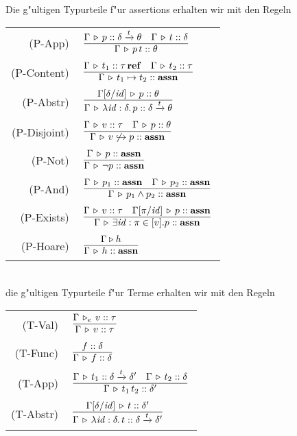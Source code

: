 \documentclass[12pt,a4paper,bigheadings]{scrartcl}
\newcommand{\assn}{\ensuremath{\mathbf{assn}}}
\newcommand{\tto}{\ensuremath{\xrightarrow{t}}}
\renewcommand{\disjoint}[2]{\ensuremath{#2\not\hookrightarrow#1}}
\newcommand{\RN}[1]{\mbox{{\sc (#1)}}}
\newcommand{\Tje}[3]{#1 \,\tr_e\, #2\cc#3}
\begin{document}
Die g"ultigen Typurteile f"ur assertions erhalten wir mit den Regeln \\[3mm]
\begin{tabular}{rl}
  \RN{P-App} & $\regel{\Tj{\Gamma}{p}{\delta \tto \theta} \quad \Tj{\Gamma}{t}{\delta}}
                      {\Tj{\Gamma}{\app{p}{t}}{\theta}}$ \\[1mm]
  \RN{P-Content} & $\regel{\Tj{\Gamma}{t_1}{\reftype{\tau}} \quad \Tj{\Gamma}{t_2}{\tau}}
                          {\Tj{\Gamma}{t_1 \mapsto t_2}{\assn}}$ \\[1mm]
  \RN{P-Abstr} & $\regel{\Tj{\Gamma[\delta/\id]}{p}{\theta}}
                        {\Tj{\Gamma}{\abstr{\id:\delta}{p}}{\delta \tto \theta}}$ \\[1mm]
  \RN{P-Disjoint} & $\regel{\Tj{\Gamma}{v}{\tau} \quad \Tj{\Gamma}{p}{\theta}}
                           {\Tj{\Gamma}{\disjoint{p}{v}}{\assn}}$ \\[1mm]
  \RN{P-Not} & $\regel{\Tj{\Gamma}{p}{\assn}}
                      {\Tj{\Gamma}{\neg p}{\assn}}$ \\[1mm]
  \RN{P-And} & $\regel{\Tj{\Gamma}{p_1}{\assn} \quad \Tj{\Gamma}{p_2}{\assn}}
                      {\Tj{\Gamma}{p_1 \wedge p_2}{\assn}}$ \\[1mm]
  \RN{P-Exists} & $\regel{\Tj{\Gamma}{v}{\tau} \quad \Tj{\Gamma[\pi/\id]}{p}{\assn}}
                         {\Tj{\Gamma}{\exists \id:\pi\in[v].p}{\assn}}$ \\[1mm]
  \RN{P-Hoare} & $\regel{\Tjh{\Gamma}{h}}
                        {\Tj{\Gamma}{h}{\assn}}$
\end{tabular} \\[3mm]
die g"ultigen Typurteile f"ur Terme erhalten wir mit den Regeln \\[3mm]
\begin{tabular}{rl}
  \RN{T-Val} & $\regel{\Tje{\Gamma}{v}{\tau}}
                      {\Tj{\Gamma}{v}{\tau}}$ \\[1mm]
  \RN{T-Func} & $\regel{\tj{f}{\delta}}
                       {\Tj{\Gamma}{f}{\delta}}$ \\[1mm]
  \RN{T-App} & $\regel{\Tj{\Gamma}{t_1}{\delta \tto \delta'} \quad \Tj{\Gamma}{t_2}{\delta}}
                      {\Tj{\Gamma}{\app{t_1}{t_2}}{\delta'}}$ \\[1mm]
  \RN{T-Abstr} & $\regel{\Tj{\Gamma[\delta/\id]}{t}{\delta'}}
                        {\Tj{\Gamma}{\abstr{\id:\delta}{t}}{\delta \tto \delta'}}$ \\[1mm]
\end{tabular} \\[3mm]
\end{document}
